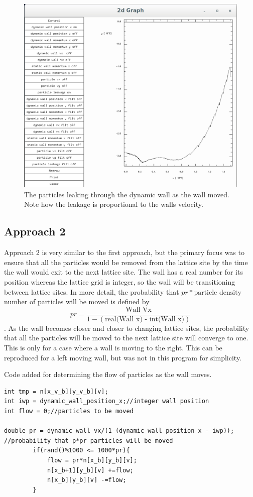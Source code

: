 \documentclass{article}
\begin{document}
\begin{figure}[H]
\includegraphics[scale=0.35]{A1p5.png}
\caption{\label{fig} The particles leaking through the dynamic wall as the wall moved. Note how the leakage is proportional to the walls velocity.}
\end{figure}

\subsection{Approach 2}
Approach 2 is very similar to the first approach, but the primary focus was to ensure that all the particles would be removed from the lattice site by the time the wall would exit to the next lattice site. The wall has a real number for its position whereas the lattice grid is integer, so the wall will be transitioning between lattice sites. In more detail, the probability that $ pr * \textrm{particle density}$ number of particles will be moved is defined by $$pr = \frac{\textrm{Wall Vx}}{1-(\textrm{real(Wall x) - int(Wall x)})}$$. As the wall becomes closer and closer to changing lattice sites, the probability that all the particles will be moved to the next lattice site will converge to one. This is only for a case where a wall is moving to the right. This can be reproduced for a left moving wall, but was not in this program for simplicity.

\vspace{5mm}
Code added for determining the flow of particles as the wall moves.
\begin{verbatim}
int tmp = n[x_v_b][y_v_b][v];
int iwp = dynamic_wall_position_x;//integer wall position
int flow = 0;//particles to be moved
		
double pr = dynamic_wall_vx/(1-(dynamic_wall_position_x - iwp));
//probability that p*pr particles will be moved
		if(rand()%1000 <= 1000*pr){
			flow = pr*n[x_b][y_b][v];
			n[x_b+1][y_b][v] +=flow;
			n[x_b][y_b][v] -=flow;
		}
 \end{verbatim}
\vspace{5mm}
\end{document}
